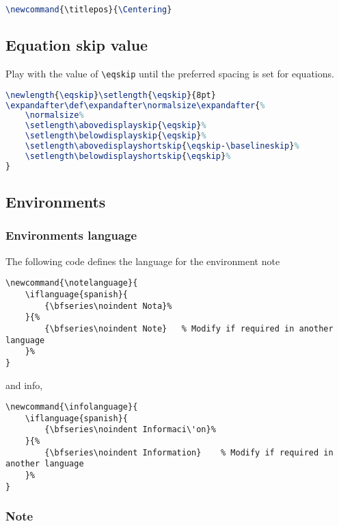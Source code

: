 \documentclass[9pt,a4paper,twoside]{tau}
\begin{document}
\begin{lstlisting}[language=TeX, caption=Alternative title.]
\newcommand{\titlepos}{\Centering}
\end{lstlisting}

    \subsection{Equation skip value}

        Play with the value of \verb|\eqskip| until the preferred spacing is set for equations.

\begin{lstlisting}[language=TeX, caption=Equation skip code.]
\newlength{\eqskip}\setlength{\eqskip}{8pt}
\expandafter\def\expandafter\normalsize\expandafter{%
    \normalsize%
    \setlength\abovedisplayskip{\eqskip}%
    \setlength\belowdisplayskip{\eqskip}%
    \setlength\abovedisplayshortskip{\eqskip-\baselineskip}%
    \setlength\belowdisplayshortskip{\eqskip}%
}
\end{lstlisting}

    \subsection{Environments}

        \subsubsection{Environments language}

            The following code defines the language for the environment note

\begin{lstlisting}[language=Tex, caption= Note language.]
\newcommand{\notelanguage}{
    \iflanguage{spanish}{
        {\bfseries\noindent Nota}%
    }{%
        {\bfseries\noindent Note}   % Modify if required in another language
    }%
}
\end{lstlisting}

        and info,

\begin{lstlisting}[language=Tex, caption= Info language.]
\newcommand{\infolanguage}{
    \iflanguage{spanish}{
        {\bfseries\noindent Informaci\'on}%
    }{%
        {\bfseries\noindent Information}    % Modify if required in another language
    }%
}
\end{lstlisting}
		
	\subsubsection{Note}
\end{document}
